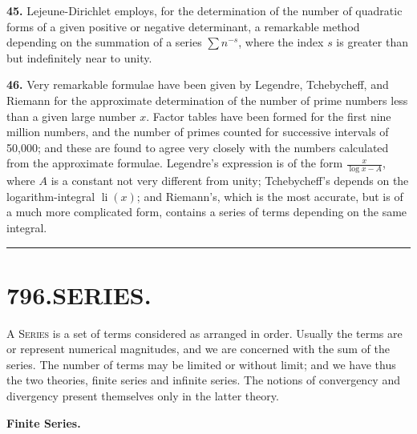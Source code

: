 \documentclass[11pt,a4paper]{article}
\begin{document}
\textbf{45.}\quad
Lejeune-Dirichlet employs, for the determination of the number of quadratic forms of a given positive or negative determinant, a remarkable method depending on the summation of a series $\sum n^{-s}$, where the index $s$ is greater than but indefinitely near to unity.

\textbf{46.}\quad
Very remarkable formulae have been given by Legendre, Tchebycheff, and Riemann for the approximate determination of the number of prime numbers less than a given large number $x$. Factor tables have been formed for the first nine million numbers, and the number of primes counted for successive intervals of 50,000; and these are found to agree very closely with the numbers calculated from the approximate formulae. Legendre's expression is of the form $\frac{x}{\log x - A}$, where $A$ is a constant not very different from unity; Tchebycheff's depends on the logarithm-integral $\operatorname{li}(x)$; and Riemann's, which is the most accurate, but is of a much more complicated form, contains a series of terms depending on the same integral.

\vspace{1em}
\hrule
\vspace{1em}



\section*{796.\quad SERIES.}


\smallskip

A \textsc{Series} is a set of terms considered as arranged in order. Usually the terms are or represent numerical magnitudes, and we are concerned with the sum of the series. The number of terms may be limited or without limit; and we have thus the two theories, finite series and infinite series. The notions of convergency and divergency present themselves only in the latter theory.

\bigskip
\noindent\textbf{Finite Series.}

\smallskip
\end{document}
